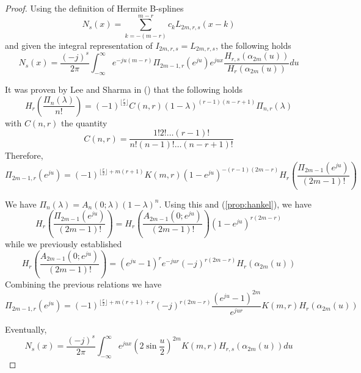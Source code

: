 \documentclass[a4paper, 11pt]{article}
\begin{document}
\begin{proof}
Using the definition of Hermite B-splines
\begin{equation*}
  N_s(x) = \sum_{k=-(m-r)}^{m-r} c_k L_{2m,r,s}(x-k)
\end{equation*}
and given the integral representation of $I_{2m,r,s} = L_{2m,r,s}$, the following holds
\begin{equation}
  N_s(x) = \frac{{(-j)}^s}{2\pi} \int_{-\infty}^{\infty} e^{-ju(m-r)} \Pi_{2m-1,r}(e^{ju}) e^{jux} \frac{H_{r, 
  s}(\alpha_{2m}(u))}{H_r(\alpha_{2m}(u))} du
\end{equation}

It was proven by Lee and Sharma in (\cite[Theorem 4]{LeeSh76}) that the following holds
  \begin{equation}\label{eq:LeeSh}
    H_r\left(\frac{\Pi_{n}(\lambda)}{n!}\right) = {(-1)}^{\lfloor \frac{r}{2}\rfloor} C(n,r) 
    {(1-\lambda)}^{(r-1)(n-r+1)} \Pi_{n,r}(\lambda)
\end{equation}
with $C(n,r)$ the quantity
\begin{equation*}
  C(n,r) = \frac{1!2!\ldots(r-1)!}{n!(n-1)!\ldots(n-r+1)!}
\end{equation*}
Therefore,
\begin{equation*}
  \Pi_{2m-1,r}(e^{ju}) = {(-1)}^{\lfloor \frac{r}{2} \rfloor + m(r+1)} K(m,r) {(1-e^{ju})}^{-(r-1)(2m-r)} H_r\left( 
  \frac{\Pi_{2m-1}(e^{ju})}{(2m-1)!} \right)
\end{equation*}

We have $\Pi_{n}(\lambda) = A_n(0;\lambda){(1-\lambda)}^n$.  Using this and (\ref{prop:hankel}), we have
\begin{equation*}
  H_r\left(\frac{\Pi_{2m-1}(e^{ju})}{(2m-1)!}\right) = H_r\left(\frac{A_{2m-1}(0;e^{ju})}{(2m-1)!}\right) 
  {(1-e^{ju})}^{r(2m-r)}
\end{equation*}
while we previously established
\begin{equation*}
  H_r\left(\frac{A_{2m-1}(0;e^{ju})}{(2m-1)!}\right) = {(e^{ju}-1)}^{r}e^{-jur} {(-j)}^{r(2m-r)} 
  H_r(\alpha_{2m} (u))
\end{equation*}
Combining the previous relations we have
\begin{equation}
  \Pi_{2m-1,r}(e^{ju}) = {(-1)}^{\lfloor \frac{r}{2} \rfloor + m(r+1) + r} {(-j)}^{r(2m-r)} 
  \frac{{\left(e^{ju}-1\right)}^{2m}}{e^{jur}} K(m,r) H_r(\alpha_{2m}(u))
\end{equation}

Eventually,
\begin{equation}
  N_s(x) = \frac{{(-j)}^{s}}{2\pi} \int_{-\infty}^{\infty} e^{jux} {\left(2\sin \frac{u}{2}\right)}^{2m} K(m,r)   
  H_{r,s}(\alpha_{2m}(u)) du
\end{equation}

\end{proof}
\end{document}
